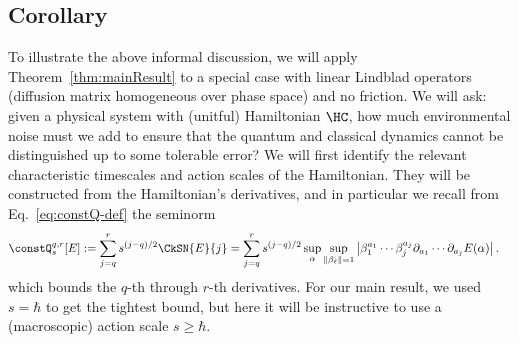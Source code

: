 \documentclass{article}
\numberwithin{equation}{section}
\begin{document}
\subsection{Corollary}

To illustrate the above informal discussion, we will apply Theorem~\ref{thm:mainResult} to a special case with linear Lindblad operators (diffusion matrix homogeneous over phase space) and no friction.  We will ask: given a physical system with (unitful) Hamiltonian $\HC$, how much environmental noise must we add to ensure that the quantum and classical dynamics cannot be distinguished up to some tolerable error?  We will first identify the relevant characteristic timescales and action scales of the Hamiltonian. They will be constructed from the Hamiltonian's derivatives, and in particular we recall from Eq.~\eqref{eq:constQ-def} the seminorm
\begin{align}
\constQ^{q,r}_{s}[E]
&:= 
\sum_{j=q}^r s^{(j-q)/2}\CkSN{E}{j}
= \sum_{j=q}^r s^{(j-q)/2} \sup_\alpha \sup_{\|\beta_\ell\|=1}
    \left|\beta_1^{a_1} \cdots \beta_j^{a_j} \partial_{a_1}\cdots\partial_{a_j} E(\alpha)\right|.
\end{align}
which bounds the $q$-th through $r$-th derivatives. For our main result, we used $s=\hbar$ to get the tightest bound, but here it will be instructive to use a (macroscopic) action scale $s \ge\hbar$.
\end{document}
